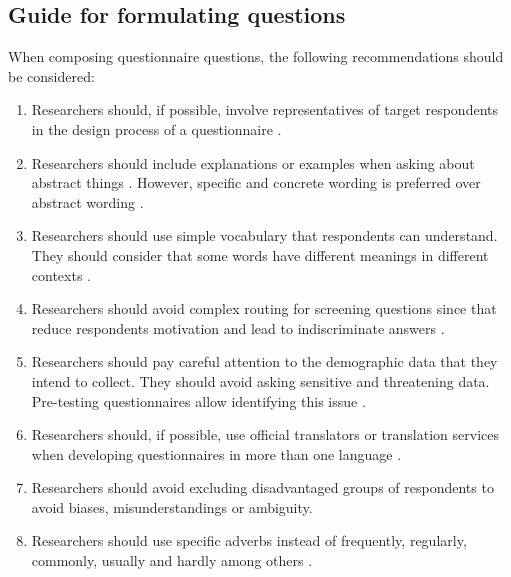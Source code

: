 \subsection{Guide for formulating questions}
\label{sec:questions_guide}
When composing questionnaire questions, the following recommendations should be considered:

\begin{enumerate}
    \item Researchers should, if possible, involve representatives of target respondents in the design process of a questionnaire \autocite{Boynton2004b}.
    
    \item Researchers should include explanations or examples when asking about abstract things \autocite{Boynton2004b,Crawford1997}. However, specific and concrete wording is preferred over abstract wording \autocite{Krosnick2009}.
    
    \item Researchers should use simple vocabulary that respondents can understand. They should consider that some words have different meanings in different contexts \autocite{Boynton2004b,Diem,Krosnick2009}.
    
    \item Researchers should avoid complex routing for screening questions since that reduce respondents motivation and lead to indiscriminate answers \autocite{Boynton2004b}.
    
    \item Researchers should pay careful attention to the demographic data that they intend to collect. They should avoid asking sensitive and threatening data. Pre-testing questionnaires allow identifying this issue \autocite{Boynton2004b}.
    
    \item Researchers should, if possible, use official translators or translation services when developing questionnaires in more than one language \autocite{Boynton2004b}.
    
    \item Researchers should avoid excluding disadvantaged groups of respondents to avoid biases, misunderstandings or ambiguity\autocite{Boynton2004b}.
    
    \item Researchers should use specific adverbs instead of frequently, regularly, commonly, usually and hardly among others \autocite{Boynton2004c,Krosnick2009}.
    

\end{enumerate}
